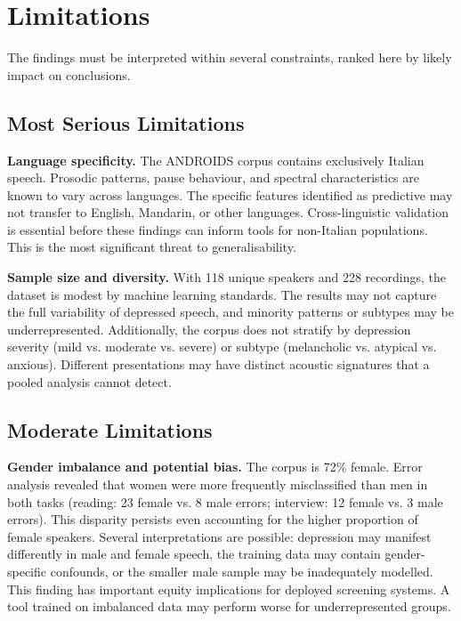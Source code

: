\section{Limitations}

The findings must be interpreted within several constraints, ranked here by likely impact on conclusions.

\subsection{Most Serious Limitations}

\textbf{Language specificity.} The ANDROIDS corpus contains exclusively Italian speech. Prosodic patterns, pause behaviour, and spectral characteristics are known to vary across languages. The specific features identified as predictive may not transfer to English, Mandarin, or other languages. Cross-linguistic validation is essential before these findings can inform tools for non-Italian populations. This is the most significant threat to generalisability.

\textbf{Sample size and diversity.} With 118 unique speakers and 228 recordings, the dataset is modest by machine learning standards. The results may not capture the full variability of depressed speech, and minority patterns or subtypes may be underrepresented. Additionally, the corpus does not stratify by depression severity (mild vs. moderate vs. severe) or subtype (melancholic vs. atypical vs. anxious). Different presentations may have distinct acoustic signatures that a pooled analysis cannot detect.

\subsection{Moderate Limitations}

\textbf{Gender imbalance and potential bias.} The corpus is 72\% female. Error analysis revealed that women were more frequently misclassified than men in both tasks (reading: 23 female vs. 8 male errors; interview: 12 female vs. 3 male errors). This disparity persists even accounting for the higher proportion of female speakers. Several interpretations are possible: depression may manifest differently in male and female speech, the training data may contain gender-specific confounds, or the smaller male sample may be inadequately modelled. This finding has important equity implications for deployed screening systems. A tool trained on imbalanced data may perform worse for underrepresented groups.


